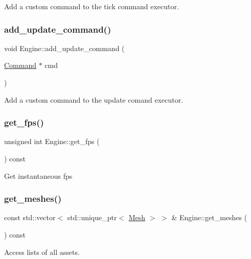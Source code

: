 Add a custom command to the tick command executor. \mbox{\label{class_engine_a50fc8b735ed53d1157316b35959cad00}} 
\subsubsection{\texorpdfstring{add\+\_\+update\+\_\+command()}{add\_update\_command()}}
{\footnotesize\ttfamily void Engine\+::add\+\_\+update\+\_\+command (\begin{DoxyParamCaption}\item[{\mbox{\hyperlink{class_command}{Command}} $\ast$}]{cmd }\end{DoxyParamCaption})}

Add a custom command to the update comand executor. \mbox{\label{class_engine_a9b33dc683a75b1a3deb14a7280003b38}} 
\subsubsection{\texorpdfstring{get\+\_\+fps()}{get\_fps()}}
{\footnotesize\ttfamily unsigned int Engine\+::get\+\_\+fps (\begin{DoxyParamCaption}{ }\end{DoxyParamCaption}) const}

Get instantaneous fps \mbox{\label{class_engine_a0cab1935798c43bd3a9f5ed3a4de1f04}} 
\subsubsection{\texorpdfstring{get\+\_\+meshes()}{get\_meshes()}}
{\footnotesize\ttfamily const std\+::vector$<$ std\+::unique\+\_\+ptr$<$ \mbox{\hyperlink{class_mesh}{Mesh}} $>$ $>$ \& Engine\+::get\+\_\+meshes (\begin{DoxyParamCaption}{ }\end{DoxyParamCaption}) const}

Access lists of all assets. \mbox{\label{class_engine_a17d339997f946c7156a65da927f69c2e}} 
